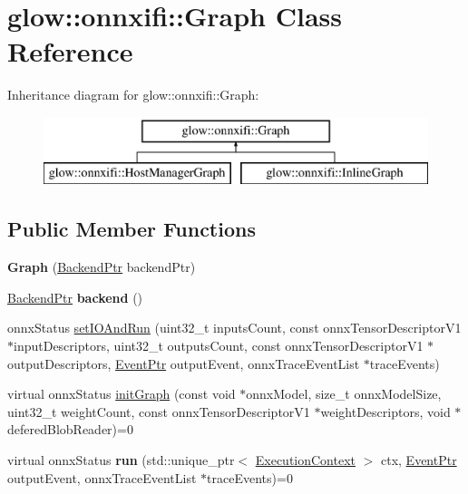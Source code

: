 \hypertarget{classglow_1_1onnxifi_1_1_graph}{}\section{glow\+:\+:onnxifi\+:\+:Graph Class Reference}
\label{classglow_1_1onnxifi_1_1_graph}
Inheritance diagram for glow\+:\+:onnxifi\+:\+:Graph\+:\begin{figure}[H]
\begin{center}
\leavevmode
\includegraphics[height=2.000000cm]{classglow_1_1onnxifi_1_1_graph}
\end{center}
\end{figure}
\subsection*{Public Member Functions}
\begin{DoxyCompactItemize}
\item 
\mbox{\label{classglow_1_1onnxifi_1_1_graph_a4b44951488df2f1d54ee36b35d17b70a}} 
{\bfseries Graph} (\hyperlink{classglow_1_1onnxifi_1_1_backend}{Backend\+Ptr} backend\+Ptr)
\item 
\mbox{\label{classglow_1_1onnxifi_1_1_graph_ac1abaeab6d1703aec7253b377011a6a6}} 
\hyperlink{classglow_1_1onnxifi_1_1_backend}{Backend\+Ptr} {\bfseries backend} ()
\item 
onnx\+Status \hyperlink{classglow_1_1onnxifi_1_1_graph_a3439d113f0153c6cb41331658ed0ccc2}{set\+I\+O\+And\+Run} (uint32\+\_\+t inputs\+Count, const onnx\+Tensor\+Descriptor\+V1 $\ast$input\+Descriptors, uint32\+\_\+t outputs\+Count, const onnx\+Tensor\+Descriptor\+V1 $\ast$output\+Descriptors, \hyperlink{classglow_1_1onnxifi_1_1_event}{Event\+Ptr} output\+Event, onnx\+Trace\+Event\+List $\ast$trace\+Events)
\item 
virtual onnx\+Status \hyperlink{classglow_1_1onnxifi_1_1_graph_a5f1ec69446852a2515d8aeec487a521a}{init\+Graph} (const void $\ast$onnx\+Model, size\+\_\+t onnx\+Model\+Size, uint32\+\_\+t weight\+Count, const onnx\+Tensor\+Descriptor\+V1 $\ast$weight\+Descriptors, void $\ast$defered\+Blob\+Reader)=0
\item 
\mbox{\label{classglow_1_1onnxifi_1_1_graph_a2c4e460e6651e515c257b9d9ad448f70}} 
virtual onnx\+Status {\bfseries run} (std\+::unique\+\_\+ptr$<$ \hyperlink{classglow_1_1_execution_context}{Execution\+Context} $>$ ctx, \hyperlink{classglow_1_1onnxifi_1_1_event}{Event\+Ptr} output\+Event, onnx\+Trace\+Event\+List $\ast$trace\+Events)=0
\end{DoxyCompactItemize}

